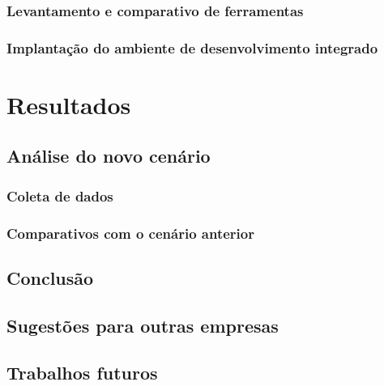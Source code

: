\documentclass[
	12pt,				%
	openright,			%
	twoside,			%
	a4paper,			%
	english,			%
	french,				%
	spanish,			%
	brazil,				%
	]{abntex2}
\begin{document}
\section{Levantamento e comparativo de ferramentas}

\section{Implantação do ambiente de desenvolvimento integrado}





\part{Resultados}

\chapter{Análise do novo cenário}

\section{Coleta de dados}

\section{Comparativos com o cenário anterior}

\chapter{Conclusão}

\chapter{Sugestões para outras empresas}

\chapter{Trabalhos futuros}
\end{document}
